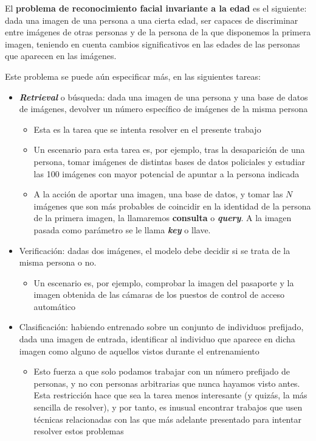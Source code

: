 El \textbf{problema de reconocimiento facial invariante a la edad} es el siguiente: dada una imagen de una persona a una cierta edad, ser capaces de discriminar entre imágenes de otras personas y de la persona de la que disponemos la primera imagen, teniendo en cuenta cambios significativos en las edades de las personas que aparecen en las imágenes.

Este problema se puede aún especificar más, en las siguientes tareas:

\begin{itemize}
    \item \textbf{\textit{Retrieval}} o búsqueda: dada una imagen de una persona y una base de datos de imágenes, devolver un número específico de imágenes de la misma persona

        \begin{itemize}
            \item Esta es la tarea que se intenta resolver en el presente trabajo
            \item Un escenario para esta tarea es, por ejemplo, tras la desaparición de una persona, tomar imágenes de distintas bases de datos policiales y estudiar las 100 imágenes con mayor potencial de apuntar a la persona indicada
            \item A la acción de aportar una imagen, una base de datos, y tomar las $N$ imágenes que son más probables de coincidir en la identidad de la persona de la primera imagen, la llamaremos \textbf{consulta} o \textbf{\textit{query}}. A la imagen pasada como parámetro se le llama \textbf{\textit{key}} o llave.
        \end{itemize}

    \item Verificación: dadas dos imágenes, el modelo debe decidir si se trata de la misma persona o no.
        \begin{itemize}
            \item Un escenario es, por ejemplo, comprobar la imagen del pasaporte y la imagen obtenida de las cámaras de los puestos de control de acceso automático
        \end{itemize}

    \item Clasificación: habiendo entrenado sobre un conjunto de individuos prefijado, dada una imagen de entrada, identificar al individuo que aparece en dicha imagen como alguno de aquellos vistos durante el entrenamiento
        \begin{itemize}
            \item Esto fuerza a que solo podamos trabajar con un número prefijado de personas, y no con personas arbitrarias que nunca hayamos visto antes. Esta restricción hace que sea la tarea menos interesante (y quizás, la más sencilla de resolver), y por tanto, es inusual encontrar trabajos que usen técnicas relacionadas con las que más adelante presentado para intentar resolver estos problemas
        \end{itemize}
\end{itemize}

